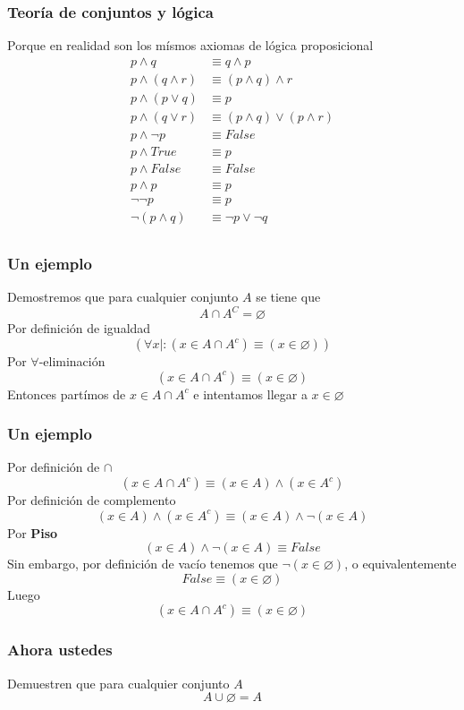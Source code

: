 \documentclass{beamer}
\begin{document}
\begin{frame}[fragile]
    \frametitle{Teoría de conjuntos y lógica}
    Porque en realidad son los mísmos axiomas de lógica proposicional
    \begin{align*}
        p \land q &\equiv q \land p \\
        p \land (q \land r) &\equiv (p \land q) \land r \\
        p \land (p \lor q) &\equiv p \\
        p \land (q \lor r) &\equiv (p \land q) \lor (p \land r) \\
        p \land \lnot p &\equiv False \\
        p \land True &\equiv p \\
        p \land False &\equiv False \\
        p \land p &\equiv p \\
        \lnot \lnot p &\equiv p \\
        \lnot (p \land q) &\equiv \lnot p \lor \lnot q \\
    \end{align*}
\end{frame}

\begin{frame}[fragile]
    \frametitle{Un ejemplo}
    Demostremos que para cualquier conjunto $A$ se tiene que
    $$A \cap A^C = \varnothing$$
    Por definición de igualdad
    $$(\forall x \mid : (x \in A \cap A^c) \equiv (x \in \varnothing))$$
    Por $\forall$-eliminación
    $$(x \in A \cap A^c) \equiv (x \in \varnothing)$$
    Entonces partímos de $x \in A \cap A^c$ e intentamos llegar a $x \in \varnothing$
\end{frame}

\begin{frame}[fragile]
    \frametitle{Un ejemplo}
    Por definición de $\cap$
    $$(x \in A \cap A^c) \equiv (x \in A) \land (x \in A^c)$$
    Por definición de complemento
    $$(x \in A) \land (x \in A^c) \equiv (x \in A) \land \lnot (x \in A)$$
    Por \textbf{Piso}
    $$(x \in A) \land \lnot (x \in A) \equiv False$$
    Sin embargo, por definición de vacío tenemos que $\lnot (x  \in \varnothing)$, o equivalentemente
    $$False \equiv (x \in \varnothing)$$
    Luego
    $$(x \in A \cap A^c) \equiv (x \in \varnothing)$$
\end{frame}

\begin{frame}[fragile]
    \frametitle{Ahora ustedes}
    Demuestren que para cualquier conjunto $A$
    $$A \cup \varnothing = A$$
    \vspace{160pt}
\end{frame}
\end{document}
